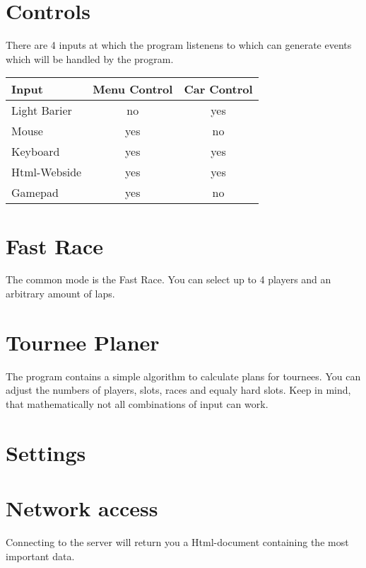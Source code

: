 \documentclass[11pt, a4paper, UKenglish, parskip=half+]{scrbook}
\begin{document}
\section{Controls}
There are 4 inputs at which the program listenens to which can generate events which will be handled by the program.
\begin{table}[H]
\begin{tabular}{l|c c}
Input & Menu Control & Car Control\\\hline
Light Barier & no & yes\\
Mouse & yes & no\\
Keyboard & yes & yes\\
Html-Webside & yes & yes\\
Gamepad & yes & no
\end{tabular}
\end{table}
\begin{comment}
\begin{table}[H]
\begin{tabular}{l}
Up\\
Down\\
Left\\
Right\\
Enter\\
Back\\
Add Count <n>\\
Remove Count <n>
\end{tabular}
\end{table}
\end{comment}
\section{Fast Race}
The common mode is the Fast Race. You can select up to 4 players and an arbitrary amount of laps.
\section{Tournee Planer}
The program contains a simple algorithm to calculate plans for tournees. You can adjust the numbers of players, slots, races and equaly hard slots. Keep in mind, that mathematically not all combinations of input can work.
\section{Settings}
\section{Network access}
Connecting to the server will return you a Html-document containing the most important data.
\end{document}
